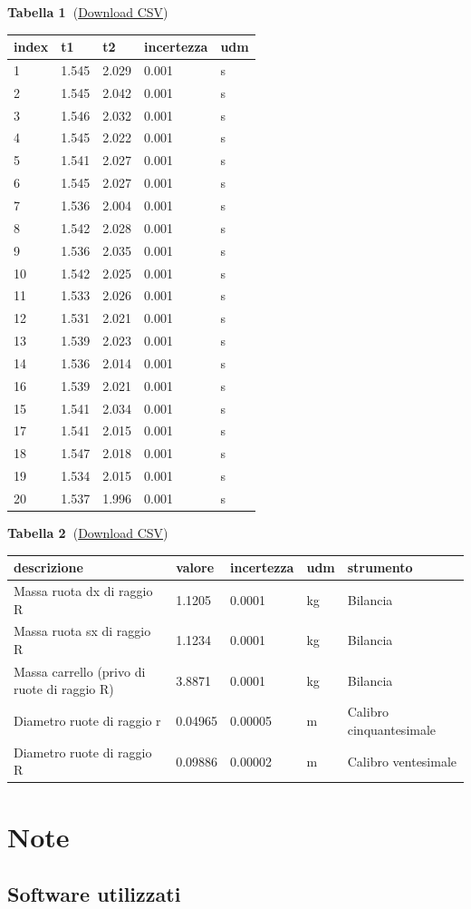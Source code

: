 \documentclass[10pt,a4paper]{article}
\begin{document}
\textbf{Tabella
1~}(\href{https://raw.githubusercontent.com/dennisangemi/lab1-dfa/main/exp-1/experimental-data-1.csv}{Download
CSV})
\begin{longtable}[]{@{}lllll@{}}
\toprule
index & t1 & t2 & incertezza & udm\tabularnewline
\midrule
\endhead
1 & 1.545 & 2.029 & 0.001 & s\tabularnewline
2 & 1.545 & 2.042 & 0.001 & s\tabularnewline
3 & 1.546 & 2.032 & 0.001 & s\tabularnewline
4 & 1.545 & 2.022 & 0.001 & s\tabularnewline
5 & 1.541 & 2.027 & 0.001 & s\tabularnewline
6 & 1.545 & 2.027 & 0.001 & s\tabularnewline
7 & 1.536 & 2.004 & 0.001 & s\tabularnewline
8 & 1.542 & 2.028 & 0.001 & s\tabularnewline
9 & 1.536 & 2.035 & 0.001 & s\tabularnewline
10 & 1.542 & 2.025 & 0.001 & s\tabularnewline
11 & 1.533 & 2.026 & 0.001 & s\tabularnewline
12 & 1.531 & 2.021 & 0.001 & s\tabularnewline
13 & 1.539 & 2.023 & 0.001 & s\tabularnewline
14 & 1.536 & 2.014 & 0.001 & s\tabularnewline
16 & 1.539 & 2.021 & 0.001 & s\tabularnewline
15 & 1.541 & 2.034 & 0.001 & s\tabularnewline
17 & 1.541 & 2.015 & 0.001 & s\tabularnewline
18 & 1.547 & 2.018 & 0.001 & s\tabularnewline
19 & 1.534 & 2.015 & 0.001 & s\tabularnewline
20 & 1.537 & 1.996 & 0.001 & s\tabularnewline
\bottomrule
\end{longtable}

\textbf{Tabella
2~}(\href{https://raw.githubusercontent.com/dennisangemi/lab1-dfa/main/exp-1/experimental-data-2.csv}{Download
CSV})
\begin{longtable}[]{@{}lllll@{}}
\toprule
descrizione & valore & incertezza & udm & strumento\tabularnewline
\midrule
\endhead
Massa ruota dx di raggio R & 1.1205 & 0.0001 & kg &
Bilancia\tabularnewline
Massa ruota sx di raggio R & 1.1234 & 0.0001 & kg &
Bilancia\tabularnewline
Massa carrello (privo di ruote di raggio R) & 3.8871 & 0.0001 & kg &
Bilancia\tabularnewline
Diametro ruote di raggio r & 0.04965 & 0.00005 & m & Calibro
cinquantesimale\tabularnewline
Diametro ruote di raggio R & 0.09886 & 0.00002 & m & Calibro
ventesimale\tabularnewline
\bottomrule
\end{longtable}

\section*{Note}

{\label{277394}}

\subsection*{Software utilizzati}
\end{document}

